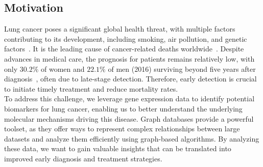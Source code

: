 \subsection{Motivation} \label{subsec:motivation}
Lung cancer poses a significant global health threat, with multiple factors contributing to its development,
including smoking, air pollution, and genetic factors~\cite{ferlay2024global}.
It is the leading cause of cancer-related deaths worldwide~\cite{ferlay2024global}.
Despite advances in medical care, the prognosis for patients remains relatively low,
with only $30.2\%$ of women and $22.1\%$ of men (2016) surviving beyond five years after diagnosis~\cite{seer2024explorer},
often due to late-stage detection.
Therefore, early detection is crucial to initiate timely treatment and reduce mortality rates.
\\

To address this challenge, we leverage gene expression data to identify potential biomarkers for lung cancer,
enabling us to better understand the underlying molecular mechanisms driving this disease.
Graph databases provide a powerful toolset, as they offer ways to represent complex relationships
between large datasets and analyze them efficiently using graph-based algorithms.
By analyzing these data, we want to gain valuable insights that can be translated into improved early diagnosis and treatment strategies.
